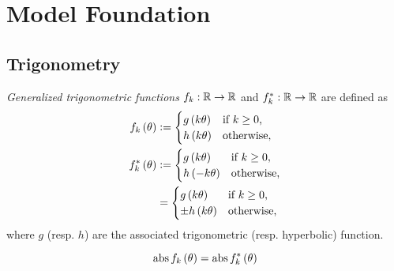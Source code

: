 \documentclass[stu, babel, american, biblatex, a4paper, leqno, draftall]{apa7}
\begin{document}
\section{Model Foundation}

\subsection{Trigonometry}
\begin{definition}\label{M:Trigonometry}
    \textit{Generalized trigonometric functions} $f_k:\mathbb{R}\to\mathbb{R}$ and $f_k^\ast:\mathbb{R}\to\mathbb{R}$ are defined as
    \begin{align*}
        f_k\left(\theta\right) & \vcentcolon=
        \begin{cases}
            g\left(k\theta\right) & \text{if $k\geq0$,} \\
            h\left(k\theta\right) & \text{otherwise,}   \\
        \end{cases} \\
        f_k^\ast\left(\theta\right) & \vcentcolon=
        \begin{cases}
            g\left(k\theta\right) & \text{if $k\geq0$,} \\
            h\left(-k\theta\right) & \text{otherwise,}   \\
        \end{cases} \\
        & =
        \begin{cases}
            g\left(k\theta\right) & \text{if $k\geq0$,} \\
            \pm h\left(k\theta\right) & \text{otherwise,}   \\
        \end{cases}
    \end{align*}
    where $g$ (resp. $h$) are the associated trigonometric (resp. hyperbolic) function.
\end{definition}
\begin{corollary}\label{M:Trigonometry:Absolute}
    \begin{equation*}
        \operatorname{abs}{f_k\left(\theta\right)}
        =
        \operatorname{abs}{f_k^\ast\left(\theta\right)}
    \end{equation*}
\end{corollary}
\end{document}

